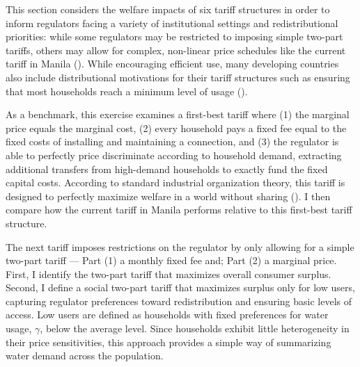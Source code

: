 \documentclass[12pt]{article}
\begin{document}
This section considers the welfare impacts of six tariff structures in order to inform regulators facing a variety of institutional settings and redistributional priorities: while some regulators may be restricted to imposing simple two-part tariffs, others may allow for complex, non-linear price schedules like the current tariff in Manila (\cite{hoque2013state}).  While encouraging efficient use, many developing countries also include distributional motivations for their tariff structures such as ensuring that most households reach a minimum level of usage (\cite{szabo2015value}).

As a benchmark, this exercise examines a first-best tariff where (1) the marginal price equals the marginal cost, (2) every household pays a fixed fee equal to the fixed costs of installing and maintaining a connection, and (3) the regulator is able to perfectly price discriminate according to household demand, extracting additional transfers from high-demand households to exactly fund the fixed capital costs.  According to standard industrial organization theory, this tariff is designed to perfectly maximize welfare in a world without sharing (\cite{auerbach1978two,oi1971disneyland}).  I then compare how the current tariff in Manila performs relative to this first-best tariff structure.

The next tariff imposes restrictions on the regulator by only allowing for a simple two-part tariff --- Part (1) a monthly fixed fee and; Part (2) a marginal price.  First, I identify the two-part tariff that maximizes overall consumer surplus.  Second, I define a social two-part tariff that maximizes surplus only for low users, capturing regulator preferences toward redistribution and ensuring basic levels of access.  Low users are defined as households with fixed preferences for water usage, $\gamma$, below the average level.  Since households exhibit little heterogeneity in their price sensitivities, this approach provides a simple way of summarizing water demand across the population.  
\end{document}
